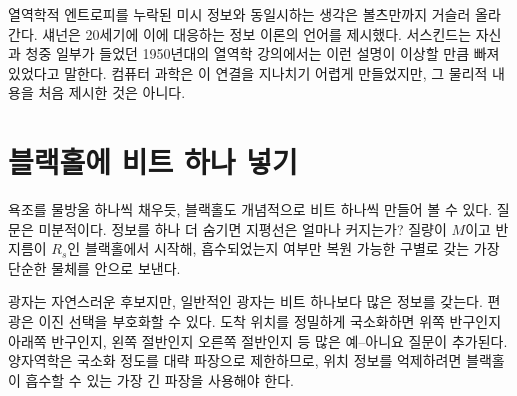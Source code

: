 열역학적 엔트로피를 누락된 미시 정보와 동일시하는 생각은 볼츠만까지 거슬러 올라간다. 섀넌은 20세기에 이에 대응하는 정보 이론의 언어를 제시했다. 서스킨드는 자신과 청중 일부가 들었던 1950년대의 열역학 강의에서는 이런 설명이 이상할 만큼 빠져 있었다고 말한다. 컴퓨터 과학은 이 연결을 지나치기 어렵게 만들었지만, 그 물리적 내용을 처음 제시한 것은 아니다.

\section{블랙홀에 비트 하나 넣기}

욕조를 물방울 하나씩 채우듯, 블랙홀도 개념적으로 비트 하나씩 만들어 볼 수 있다. 질문은 미분적이다. 정보를 하나 더 숨기면 지평선은 얼마나 커지는가? 질량이 \(M\)이고 반지름이 \(R_s\)인 블랙홀에서 시작해, 흡수되었는지 여부만 복원 가능한 구별로 갖는 가장 단순한 물체를 안으로 보낸다.

\begin{classroomqa}\end{classroomqa}

광자는 자연스러운 후보지만, 일반적인 광자는 비트 하나보다 많은 정보를 갖는다. 편광은 이진 선택을 부호화할 수 있다. 도착 위치를 정밀하게 국소화하면 위쪽 반구인지 아래쪽 반구인지, 왼쪽 절반인지 오른쪽 절반인지 등 많은 예--아니요 질문이 추가된다. 양자역학은 국소화 정도를 대략 파장으로 제한하므로, 위치 정보를 억제하려면 블랙홀이 흡수할 수 있는 가장 긴 파장을 사용해야 한다.

\begin{classroomqa}\end{classroomqa}

\begin{classroomqa}\end{classroomqa}

